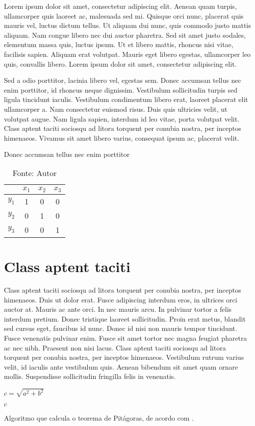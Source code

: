 \documentclass[doutorado,rascunho]{fei}
\begin{document}
Lorem ipsum dolor sit amet, consectetur adipiscing elit. Aenean quam turpis, ullamcorper quis laoreet ac, malesuada sed mi. Quisque orci nunc, placerat quis mauris vel, luctus dictum tellus. Ut aliquam dui nunc, quis commodo justo mattis aliquam. Nam congue libero nec dui auctor pharetra. Sed sit amet justo sodales, elementum massa quis, luctus ipsum. Ut et libero mattis, rhoncus nisi vitae, facilisis sapien. Aliquam erat volutpat. Mauris eget libero egestas, ullamcorper leo quis, convallis libero. Lorem ipsum dolor sit amet, consectetur adipiscing elit.

Sed a odio porttitor, lacinia libero vel, egestas sem. Donec accumsan tellus nec enim porttitor, id rhoncus neque dignissim. Vestibulum sollicitudin turpis sed ligula tincidunt iaculis. Vestibulum condimentum libero erat, laoreet placerat elit ullamcorper a. Nam consectetur euismod risus. Duis quis ultricies velit, ut volutpat augue. Nam ligula sapien, interdum id leo vitae, porta volutpat velit. Class aptent taciti sociosqu ad litora torquent per conubia nostra, per inceptos himenaeos. Vivamus sit amet libero varius, consequat ipsum ac, placerat velit.

\begin{table}[ht!]
    \caption{Donec accumsan tellus nec enim porttitor} \label{tbl:exemplo}
    \centering
    \begin{tabular}{|c|c|c|c|}
    \hline 
     & \(x_1\) & \(x_2\) & \(x_3\) \\ 
    \hline 
    \(y_1\) & 1 & 0 & 0 \\ 
    \hline 
    \(y_2\) & 0 & 1 & 0 \\ 
    \hline 
    \(y_3\) & 0 & 0 & 1 \\ 
    \hline 
    \end{tabular}
    \caption*{Fonte: Autor}
\end{table}

\section{Class aptent taciti}

Class aptent taciti sociosqu ad litora torquent per conubia nostra, per inceptos himenaeos. Duis ut dolor erat. Fusce adipiscing interdum eros, in ultrices orci auctor at. Mauris ac ante orci. In nec mauris arcu. In pulvinar tortor a felis interdum pretium. Donec tristique laoreet sollicitudin. Proin erat metus, blandit sed cursus eget, faucibus id nunc. Donec id nisi non mauris tempor tincidunt. Fusce venenatis pulvinar enim. Fusce sit amet tortor nec magna feugiat pharetra ac nec nibh. Praesent non nisi lacus. Class aptent taciti sociosqu ad litora torquent per conubia nostra, per inceptos himenaeos. Vestibulum rutrum varius velit, id iaculis ante vestibulum quis. Aenean bibendum sit amet quam ornare mollis. Suspendisse sollicitudin fringilla felis in venenatis.

\begin{algorithm}

\(c=\sqrt{a^2 + b^2}\)

\Retorna \(c\)

\caption{Algoritmo que calcula o teorema de Pitágoras, de acordo com .}
\label{lst:alg}
\end{algorithm}



\end{document}
